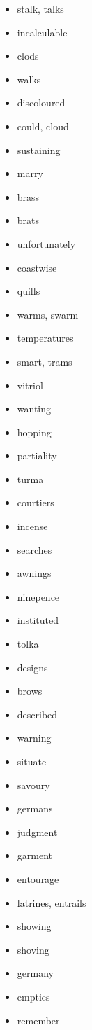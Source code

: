 \documentclass{article}
\begin{document}
\begin{itemize}
    \item stalk, talks
    \item incalculable
    \item clods
    \item walks
    \item discoloured
    \item could, cloud
    \item sustaining
    \item marry
    \item brass
    \item brats
    \item unfortunately
    \item coastwise
    \item quills
    \item warms, swarm
    \item temperatures
    \item smart, trams
    \item vitriol
    \item wanting
    \item hopping
    \item partiality
    \item turma
    \item courtiers
    \item incense
    \item searches
    \item awnings
    \item ninepence
    \item instituted
    \item tolka
    \item designs
    \item brows
    \item described
    \item warning
    \item situate
    \item savoury
    \item germans
    \item judgment
    \item garment
    \item entourage
    \item latrines, entrails
    \item showing
    \item shoving
    \item germany
    \item empties
    \item remember

\end{itemize}
\end{document}
